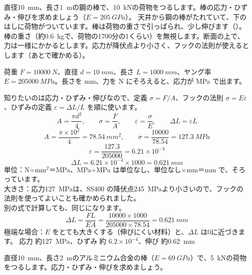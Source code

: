 
\begin{phreidai}
\label{ph:力-8:ex1}直径\qty{10}{mm}、長さ\qty{1}{m}の鋼の棒で、\qty{10}{kN}の荷物をつるします。棒の応力・ひずみ・伸びを求めましょう（$E=\qty{205}{GPa}$）。
\phbamen
天井から鋼の棒がたれていて、下のはしに荷物がついています。棒は荷物の重さで引っぱられ、少し伸びます（\bkhatenaref）。
\phmushi
棒の重さ（約\qty{0.6}{kg}で、荷物の1700分の1くらい）を無視します。断面の上で、力は一様にかかるとします。応力が降伏点より小さく、フックの法則が使えるとします（あとで確かめる）。
\phzu
\noindent\begin{minipage}[c]{0.30\linewidth}\centering
{}
\end{minipage}\hfill
\begin{minipage}[c]{0.66\linewidth}\raggedright
荷重 $F=\qty{10000}{N}$、直径 $d=\qty{10}{mm}$、長さ $L=\qty{1000}{mm}$、ヤング率 $E=\qty{205000}{MPa}$。長さを mm、力を N にそろえると、応力が MPa で出ます。
\end{minipage}
\phriyu
知りたいのは応力・ひずみ・伸びなので、定義 $\sigma=F/A$、フックの法則 $\sigma=E\varepsilon$、ひずみの定義 $\varepsilon=\Delta L/L$ を順に使います。
\phtateru
\[A=\frac{\pi d^2}{4},\qquad \sigma=\frac{F}{A},\qquad \varepsilon=\frac{\sigma}{E},\qquad \Delta L=\varepsilon L\]
\phtoku
\[A=\frac{\pi\times10^2}{4}=\qty{78.54}{mm^2},\qquad \sigma=\frac{\num{10000}}{78.54}=\qty{127.3}{MPa}\]
\[\varepsilon=\frac{127.3}{\num{205000}}=6.21\times10^{-4}\]
\[\Delta L=6.21\times10^{-4}\times1000=\qty{0.621}{mm}\]
\phtashikame
単位：N÷mm$^2$＝MPa、MPa÷MPa は単位なし、単位なし×mm＝mm で、そろっています。\\
大きさ：応力\qty{127}{MPa}は、SS400 の降伏点\qty{245}{MPa}より小さいので、フックの法則を使ってよいことも確かめられました。\\
別の式で計算しても、同じになります。
\[\Delta L=\frac{FL}{EA}=\frac{\num{10000}\times1000}{\num{205000}\times78.54}=\qty{0.621}{mm}\]
極端な場合：$E$ をとても大きくする（伸びにくい材料）と、$\Delta L$ は0に近づきます。
\kotae 応力 約\qty{127}{MPa}、ひずみ 約 $6.2\times10^{-4}$、伸び 約\qty{0.62}{mm}
\end{phreidai}
\begin{jibun}
直径\qty{10}{mm}、長さ\qty{2}{m}のアルミニウム合金の棒（$E=\qty{69}{GPa}$）で、\qty{5}{kN}の荷物をつるします。応力・ひずみ・伸びを求めましょう。
\end{jibun}

